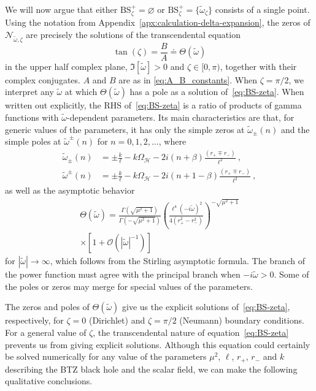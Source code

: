 \documentclass[aps, prd, amsmath, floats, floatfix, twocolumn, nofootinbib, superscriptaddress, showpacs]{revtex4-1}
\def\oo{\infty}
\def\H{\mathcal{H}}
\def\BS{\mathrm{BS}}
\def\tomega{{\tilde{\omega}}}
\begin{document}
We will now argue that either $\BS_\zeta^+ = \varnothing$ or
$\BS_\zeta^+ = \{ \tomega_\zeta \}$ consists of a single point. 
Using the notation from
Appendix~\ref{apx:calculation-delta-expansion}, the zeros of $\mathcal{N}_{\tomega,\zeta}$ are precisely the solutions of the
transcendental equation
\begin{equation} \label{eq:BS-zeta}
\tan(\zeta) = \frac{B}{A} \doteq \Theta(\tomega)
\end{equation}
in the upper half complex plane, $\Im[\tomega] > 0$ and $\zeta \in
[0,\pi)$, together with their complex conjugates. $A$ and $B$ are as in \eqref{eq:A_B_constants}.
When $\zeta = \pi/2$, we interpret any $\tomega$ at which $\Theta(\tomega)$ has a pole as a
solution of~\eqref{eq:BS-zeta}. When written out explicitly, the
RHS of~\eqref{eq:BS-zeta} is a ratio of products of
gamma functions with $\tomega$-dependent parameters. Its main
characteristics are that, for generic values of the parameters, it has only the simple zeros at $\tomega_\pm(n)$
and the simple poles at $\tomega^\pm(n)$ for
$n=0,1,2,\ldots$, where
\begin{align}
\label{eq:zeros}
\tomega_\pm(n)
&= \pm \frac{k}{\ell} -k\Omega_\H 
- 2i(n+\beta) \frac{(r_+ \mp r_-)}{\ell^2} \ ,
\\
\label{eq:poles}
\tomega^\pm(n)
&= \pm \frac{k}{\ell} -k\Omega_\H 
- 2i(n+1-\beta) \frac{(r_+ \mp r_-)}{\ell^2} \ ,
\end{align}
as well as the asymptotic behavior 
\begin{multline} \label{eq:asymptTheta}
\Theta(\tomega)
= \frac{\Gamma(\sqrt{\mu^2+1})}{\Gamma({-\sqrt{\mu^2+1}})}
\left(\frac{\ell^4 (-i\tomega)^2}{4(r_+^2-r_-^2)}\right)^{-\sqrt{\mu^2+1}}
\\
\times [1 + \mathcal{O}(|\tomega|^{-1})]
\end{multline}
for $|\tomega| \to \oo$, which follows from the Stirling asymptotic
formula. The branch of the power function must agree with the principal
branch when $-i\tomega > 0$. Some of the poles or zeros may merge for
special values of the parameters.

The zeros and poles of $\Theta(\tomega)$ give us the explicit solutions
of~\eqref{eq:BS-zeta}, respectively, for $\zeta = 0$ (Dirichlet) and
$\zeta = \pi/2$ (Neumann) boundary conditions. For a general value of
$\zeta$, the transcendental nature of equation~\eqref{eq:BS-zeta}
prevents us from giving explicit solutions. Although this equation
could certainly be solved numerically for any value of the parameters $\mu^2$,
$\ell$, $r_+$, $r_-$ and $k$ describing the BTZ black hole
and the scalar field, we can make the following qualitative
conclusions.
\end{document}
